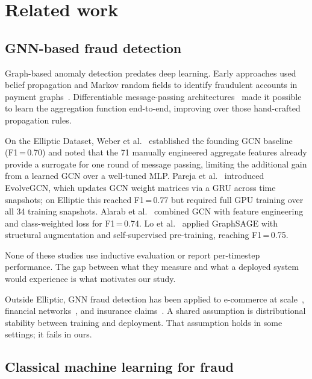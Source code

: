 \section{Related work}
\label{sec:related}

\subsection{GNN-based fraud detection}

Graph-based anomaly detection predates deep learning.  Early
approaches used belief propagation and Markov random fields to
identify fraudulent accounts in payment
graphs~\citep{akoglu2015graph}.  Differentiable message-passing
architectures~\citep{gilmer2017mpnn} made it possible to learn the
aggregation function end-to-end, improving over those hand-crafted
propagation rules.

On the Elliptic Dataset, Weber et al.~\citep{weber2019} established the
founding GCN baseline (F1\,=\,0.70) and noted that the 71 manually
engineered aggregate features already provide a surrogate for one
round of message passing, limiting the additional gain from a learned
GCN over a well-tuned MLP.  Pareja et al.~\citep{pareja2020evolvegcn}
introduced EvolveGCN, which updates GCN weight matrices via a GRU
across time snapshots; on Elliptic this reached F1\,=\,0.77 but
required full GPU training over all 34 training snapshots.  Alarab et
al.~\citep{alarab2020} combined GCN with feature engineering and
class-weighted loss for F1\,=\,0.74.  Lo et al.~\citep{lo2023} applied
GraphSAGE with structural augmentation and self-supervised pre-training,
reaching F1\,=\,0.75.

None of these studies use inductive evaluation or report per-timestep
performance.  The gap between what they measure and what a deployed
system would experience is what motivates our study.

Outside Elliptic, GNN fraud detection has been applied to e-commerce
at scale~\citep{wang2019semi}, financial networks~\citep{liu2018geniepath},
and insurance claims~\citep{pourhabibi2020fraud}.  A shared assumption
is distributional stability between training and deployment.  That
assumption holds in some settings; it fails in ours.

\subsection{Classical machine learning for fraud}

